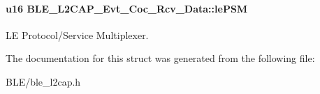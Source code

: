 \paragraph[{\texorpdfstring{le\+P\+SM}{lePSM}}]{\setlength{\rightskip}{0pt plus 5cm}u16 B\+L\+E\+\_\+\+L2\+C\+A\+P\+\_\+\+Evt\+\_\+\+Coc\+\_\+\+Rcv\+\_\+\+Data\+::le\+P\+SM}\hypertarget{struct_b_l_e___l2_c_a_p___evt___coc___rcv___data_afb946895285845b29fb857f7a88ea29c}{}\label{struct_b_l_e___l2_c_a_p___evt___coc___rcv___data_afb946895285845b29fb857f7a88ea29c}
LE Protocol/\+Service Multiplexer. 

The documentation for this struct was generated from the following file\+:\begin{DoxyCompactItemize}
\item 
B\+L\+E/ble\+\_\+l2cap.\+h\end{DoxyCompactItemize}
